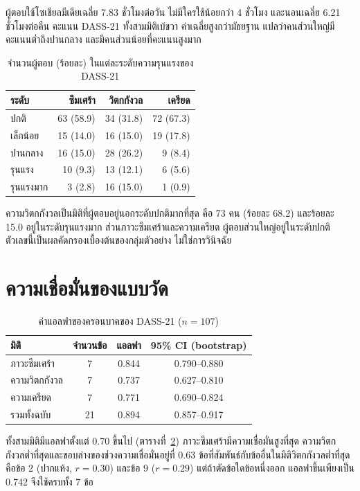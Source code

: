 ผู้ตอบใช้โซเชียลมีเดียเฉลี่ย 7.83 ชั่วโมงต่อวัน ไม่มีใครใช้น้อยกว่า 4 ชั่วโมง
และนอนเฉลี่ย 6.21 ชั่วโมงต่อคืน
คะแนน DASS-21 ทั้งสามมิติเบ้ขวา ค่าเฉลี่ยสูงกว่ามัธยฐาน
แปลว่าคนส่วนใหญ่มีคะแนนต่ำถึงปานกลาง และมีคนส่วนน้อยที่คะแนนสูงมาก

\begin{table}[H]
\centering
\caption{จำนวนผู้ตอบ (ร้อยละ) ในแต่ละระดับความรุนแรงของ DASS-21}
\label{tab:severity-result}
\begin{tabular}{|l|r|r|r|}
\hline
\textbf{ระดับ} & \textbf{ซึมเศร้า} & \textbf{วิตกกังวล} & \textbf{เครียด} \\
\hline
ปกติ & 63 (58.9) & 34 (31.8) & 72 (67.3) \\
เล็กน้อย & 15 (14.0) & 16 (15.0) & 19 (17.8) \\
ปานกลาง & 16 (15.0) & 28 (26.2) & 9 (8.4) \\
รุนแรง & 10 (9.3) & 13 (12.1) & 6 (5.6) \\
รุนแรงมาก & 3 (2.8) & 16 (15.0) & 1 (0.9) \\
\hline
\end{tabular}
\end{table}

ความวิตกกังวลเป็นมิติที่ผู้ตอบอยู่นอกระดับปกติมากที่สุด คือ 73 คน (ร้อยละ 68.2)
และร้อยละ 15.0 อยู่ในระดับรุนแรงมาก
ส่วนภาวะซึมเศร้าและความเครียด ผู้ตอบส่วนใหญ่อยู่ในระดับปกติ
ตัวเลขนี้เป็นผลคัดกรองเบื้องต้นของกลุ่มตัวอย่าง ไม่ใช่การวินิจฉัย

\section{ความเชื่อมั่นของแบบวัด}
\label{sec:reliability}

\begin{table}[H]
\centering
\caption{ค่าแอลฟาของครอนบาคของ DASS-21 ($n = 107$)}
\label{tab:alpha}
\begin{tabular}{|l|c|c|c|}
\hline
\textbf{มิติ} & \textbf{จำนวนข้อ} & \textbf{แอลฟา} & \textbf{95\% CI (bootstrap)} \\
\hline
ภาวะซึมเศร้า & 7 & 0.844 & 0.790--0.880 \\
ความวิตกกังวล & 7 & 0.737 & 0.627--0.810 \\
ความเครียด & 7 & 0.771 & 0.690--0.824 \\
รวมทั้งฉบับ & 21 & 0.894 & 0.857--0.917 \\
\hline
\end{tabular}
\end{table}

ทั้งสามมิติมีแอลฟาตั้งแต่ 0.70 ขึ้นไป (ตารางที่~\ref{tab:alpha})
ภาวะซึมเศร้ามีความเชื่อมั่นสูงที่สุด ความวิตกกังวลต่ำที่สุดและขอบล่างของช่วงความเชื่อมั่นอยู่ที่ 0.63
ข้อที่สัมพันธ์กับข้ออื่นในมิติวิตกกังวลต่ำที่สุดคือข้อ 2 (ปากแห้ง, $r = 0.30$) และข้อ 9 ($r = 0.29$)
แต่ถ้าตัดข้อใดข้อหนึ่งออก แอลฟาขึ้นเพียงเป็น 0.742 จึงใช้ครบทั้ง 7 ข้อ

